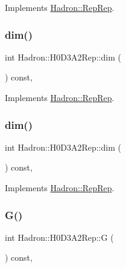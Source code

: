Implements \mbox{\hyperlink{structHadron_1_1RepRep_a92c8802e5ed7afd7da43ccfd5b7cd92b}{Hadron\+::\+Rep\+Rep}}.

\mbox{\label{structHadron_1_1H0D3A2Rep_ac1e8bf30c08358a2d9c24c5cf8c767a7}} 
\subsubsection{\texorpdfstring{dim()}{dim()}\hspace{0.1cm}{\footnotesize\ttfamily [2/3]}}
{\footnotesize\ttfamily int Hadron\+::\+H0\+D3\+A2\+Rep\+::dim (\begin{DoxyParamCaption}{ }\end{DoxyParamCaption}) const\hspace{0.3cm}{\ttfamily [inline]}, {\ttfamily [virtual]}}



Implements \mbox{\hyperlink{structHadron_1_1RepRep_a92c8802e5ed7afd7da43ccfd5b7cd92b}{Hadron\+::\+Rep\+Rep}}.

\mbox{\label{structHadron_1_1H0D3A2Rep_ac1e8bf30c08358a2d9c24c5cf8c767a7}} 
\subsubsection{\texorpdfstring{dim()}{dim()}\hspace{0.1cm}{\footnotesize\ttfamily [3/3]}}
{\footnotesize\ttfamily int Hadron\+::\+H0\+D3\+A2\+Rep\+::dim (\begin{DoxyParamCaption}{ }\end{DoxyParamCaption}) const\hspace{0.3cm}{\ttfamily [inline]}, {\ttfamily [virtual]}}



Implements \mbox{\hyperlink{structHadron_1_1RepRep_a92c8802e5ed7afd7da43ccfd5b7cd92b}{Hadron\+::\+Rep\+Rep}}.

\mbox{\label{structHadron_1_1H0D3A2Rep_add1df3c4aec7ea1f7f37f8f3e9522cdd}} 
\subsubsection{\texorpdfstring{G()}{G()}\hspace{0.1cm}{\footnotesize\ttfamily [1/2]}}
{\footnotesize\ttfamily int Hadron\+::\+H0\+D3\+A2\+Rep\+::G (\begin{DoxyParamCaption}{ }\end{DoxyParamCaption}) const\hspace{0.3cm}{\ttfamily [inline]}, {\ttfamily [virtual]}}

